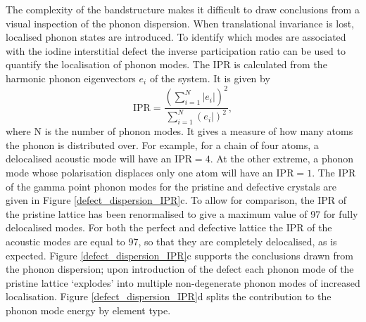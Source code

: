 The complexity of the bandstructure makes it difficult to draw conclusions from a visual inspection of the phonon dispersion.
When translational invariance is lost, localised phonon states are introduced.
To identify which modes are associated with the iodine interstitial defect the inverse participation ratio can be used to quantify the localisation of phonon modes. 
The IPR is calculated from the harmonic phonon eigenvectors $e_i$ of the system. It is given by
\begin{equation}
\mathrm{IPR} = \frac{\left(\sum_{i=1}^N|e_i|\right)^2}{\sum_{i=1}^N\left(e_i|\right)^2},
\end{equation}
where N is the number of phonon modes. It gives a measure of how many atoms the phonon is distributed over. For example, for a chain of four atoms, a delocalised acoustic mode will have an $\textrm{IPR}=4$. At the other extreme, a phonon mode whose polarisation displaces only one atom will have an $\textrm{IPR}=1$.
The IPR of the gamma point phonon modes for the pristine and defective crystals are given in Figure \ref{defect_dispersion_IPR}c.
To allow for comparison, the IPR of the pristine lattice has been renormalised to give a maximum value of 97 for fully delocalised modes.
For both the perfect and defective lattice the IPR of the acoustic modes are equal to 97, so that they are completely delocalised, as is expected.
Figure \ref{defect_dispersion_IPR}c supports the conclusions drawn from the phonon dispersion; upon introduction of the defect each phonon mode of the pristine lattice `explodes' into multiple non-degenerate phonon modes of increased localisation.
Figure \ref{defect_dispersion_IPR}d splits the contribution to the phonon mode energy by element type. 
